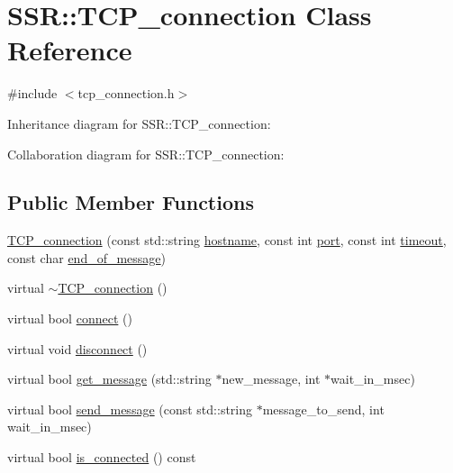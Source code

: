 \hypertarget{classSSR_1_1TCP__connection}{\section{S\-S\-R\-:\-:T\-C\-P\-\_\-connection Class Reference}
\label{classSSR_1_1TCP__connection}
}


{\ttfamily \#include $<$tcp\-\_\-connection.\-h$>$}



Inheritance diagram for S\-S\-R\-:\-:T\-C\-P\-\_\-connection\-:


Collaboration diagram for S\-S\-R\-:\-:T\-C\-P\-\_\-connection\-:
\subsection*{Public Member Functions}
\begin{DoxyCompactItemize}
\item 
\hyperlink{classSSR_1_1TCP__connection_a0a05d880ac368d6404d3b553593a8357}{T\-C\-P\-\_\-connection} (const std\-::string \hyperlink{classSSR_1_1TCP__connection_af7f5b7d55ac15ea615354eeb885512e2}{hostname}, const int \hyperlink{classSSR_1_1TCP__connection_a30734c753f6d788ee25211ba6180380d}{port}, const int \hyperlink{classSSR_1_1TCP__connection_ab190449951139b0705e2c7cd70de1903}{timeout}, const char \hyperlink{classSSR_1_1TCP__connection_a375054b2058fea473aeda2df3f2ee8be}{end\-\_\-of\-\_\-message})
\item 
virtual \hyperlink{classSSR_1_1TCP__connection_a8f2c1ee8bd67f8e3de0e51d080edcf94}{$\sim$\-T\-C\-P\-\_\-connection} ()
\item 
virtual bool \hyperlink{classSSR_1_1TCP__connection_a57551329370d667e324fc9c19d8f0ae3}{connect} ()
\item 
virtual void \hyperlink{classSSR_1_1TCP__connection_adb9bad291355dec27e72d3eb63cedeb5}{disconnect} ()
\item 
virtual bool \hyperlink{classSSR_1_1TCP__connection_a74b65153b0c0ec20cad64b7faea7f122}{get\-\_\-message} (std\-::string $\ast$new\-\_\-message, int $\ast$wait\-\_\-in\-\_\-msec)
\item 
virtual bool \hyperlink{classSSR_1_1TCP__connection_a5ac5568c97d926507c4455daf7304ec4}{send\-\_\-message} (const std\-::string $\ast$message\-\_\-to\-\_\-send, int wait\-\_\-in\-\_\-msec)
\item 
virtual bool \hyperlink{classSSR_1_1TCP__connection_a562746faf53010b01af52f02817abcd4}{is\-\_\-connected} () const 
\end{DoxyCompactItemize}
